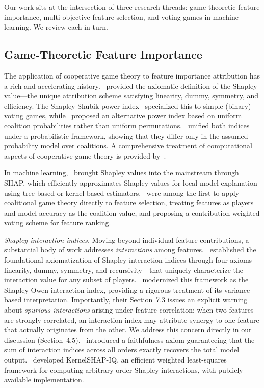 \documentclass{article} %
\begin{document}
Our work sits at the intersection of three research threads: game-theoretic feature importance, multi-objective feature selection, and voting games in machine learning. We review each in turn.

\subsection{Game-Theoretic Feature Importance}

The application of cooperative game theory to feature importance attribution has a rich and accelerating history.~\citet{shapley1953value} provided the axiomatic definition of the Shapley value---the unique attribution scheme satisfying linearity, dummy, symmetry, and efficiency. The Shapley-Shubik power index~\citep{shapley1954method} specialized this to simple (binary) voting games, while~\citet{banzhaf1965weighted} proposed an alternative power index based on uniform coalition probabilities rather than uniform permutations.~\citet{straffin1977shapley} unified both indices under a probabilistic framework, showing that they differ only in the assumed probability model over coalitions. A comprehensive treatment of computational aspects of cooperative game theory is provided by~\citet{chalkiadakis2011computational}.

In machine learning,~\citet{lundberg2017unified} brought Shapley values into the mainstream through SHAP, which efficiently approximates Shapley values for local model explanation using tree-based or kernel-based estimators.~\citet{cohen2007feature} were among the first to apply coalitional game theory directly to feature selection, treating features as players and model accuracy as the coalition value, and proposing a contribution-weighted voting scheme for feature ranking.

{\em Shapley interaction indices.} Moving beyond individual feature contributions, a substantial body of work addresses {\em interactions} among features.~\citet{grabisch1999axiomatic} established the foundational axiomatization of Shapley interaction indices through four axioms---linearity, dummy, symmetry, and recursivity---that uniquely characterize the interaction value for any subset of players.~\citet{rabitti2019shapley} modernized this framework as the Shapley-Owen interaction index, providing a rigorous treatment of its variance-based interpretation. Importantly, their Section~7.3 issues an explicit warning about {\em spurious interactions} arising under feature correlation: when two features are strongly correlated, an interaction index may attribute synergy to one feature that actually originates from the other. We address this concern directly in our discussion (Section~4.5).~\citet{tsai2023faithshap} introduced a faithfulness axiom guaranteeing that the sum of interaction indices across all orders exactly recovers the total model output.~\citet{muschalik2024kernelshapiq} developed KernelSHAP-IQ, an efficient weighted least-squares framework for computing arbitrary-order Shapley interactions, with publicly available implementation.
\end{document}
